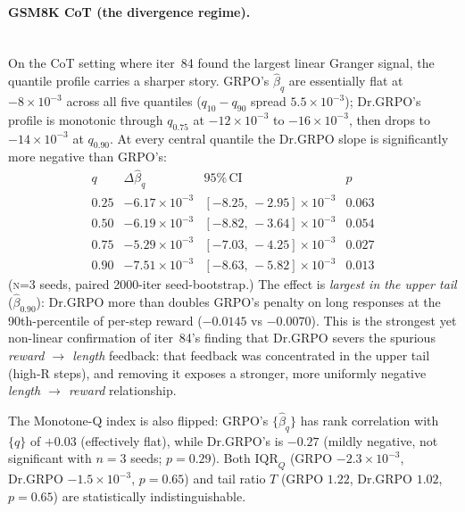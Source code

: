 \paragraph{GSM8K CoT (the divergence regime).}\leavevmode\\[-0.3em]
\label{par:cot-quant}
On the CoT setting where iter~84 found the largest linear Granger signal,
the quantile profile carries a sharper story.
GRPO's $\hat\beta_q$ are essentially flat at $-8\!\times\!10^{-3}$ across
all five quantiles ($q_{10}\!-\!q_{90}$ spread $5.5\!\times\!10^{-3}$);
Dr.GRPO's profile is monotonic through $q_{0.75}$ at $-12\!\times\!10^{-3}$
to $-16\!\times\!10^{-3}$, then drops to $-14\!\times\!10^{-3}$ at $q_{0.90}$.
At every central quantile the Dr.GRPO slope is significantly more
negative than GRPO's:
\[
\begin{array}{ccccc}
q & \Delta\hat\beta_q & 95\%\,\mathrm{CI} & p\\\hline
0.25 & -6.17\!\times\!10^{-3} & [-8.25,\, -2.95]\!\times\!10^{-3} & 0.063\\
0.50 & -6.19\!\times\!10^{-3} & [-8.82,\, -3.64]\!\times\!10^{-3} & 0.054\\
0.75 & -5.29\!\times\!10^{-3} & [-7.03,\, -4.25]\!\times\!10^{-3} & 0.027\\
0.90 & -7.51\!\times\!10^{-3} & [-8.63,\, -5.82]\!\times\!10^{-3} & 0.013
\end{array}
\]
(\textsc{n}=3 seeds, paired 2000-iter seed-bootstrap.)  The effect is
\emph{largest in the upper tail} ($\hat\beta_{0.90}$): Dr.GRPO more
than doubles GRPO's penalty on long responses at the 90th-percentile of
per-step reward ($-0.0145$ vs $-0.0070$).  This is the strongest
yet non-linear confirmation of iter~84's finding that Dr.GRPO severs
the spurious \emph{reward $\rightarrow$ length} feedback: that feedback
was concentrated in the upper tail (high-R steps), and removing it
exposes a stronger, more uniformly negative \emph{length $\rightarrow$
reward} relationship.

The Monotone-Q index is also flipped: GRPO's $\{\hat\beta_q\}$ has rank
correlation with $\{q\}$ of $+0.03$ (effectively flat), while
Dr.GRPO's is $-0.27$ (mildly negative, not significant with
$n\!=\!3$ seeds; $p\!=\!0.29$).  Both $\mathrm{IQR}_Q$
(GRPO $-2.3\!\times\!10^{-3}$, Dr.GRPO $-1.5\!\times\!10^{-3}$, $p\!=\!0.65$)
and tail ratio $T$ (GRPO $1.22$, Dr.GRPO $1.02$, $p\!=\!0.65$) are
statistically indistinguishable.

